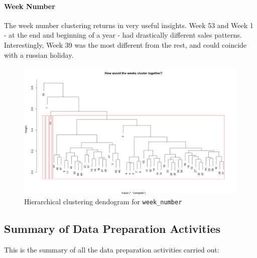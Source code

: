 \documentclass[floatsintext,man]{apa6}
\theoremstyle{definition}
\theoremstyle{definition}
\theoremstyle{definition}
\theoremstyle{remark}
\begin{document}
\paragraph{Week Number}\label{week-number}

The week number clustering returns in very useful insights. Week 53 and
Week 1 - at the end and beginning of a year - had drastically different
sales patterns. Interestingly, Week 39 was the most different from the
rest, and could coincide with a russian holiday.

\begin{figure}
\centering
\includegraphics{../graphs/hclust_week.png}
\caption{Hierarchical clustering dendogram for \texttt{week\_number}}
\end{figure}

\subsection{Summary of Data Preparation
Activities}\label{summary-of-data-preparation-activities}

This is the summary of all the data preparation activities carried out:
\end{document}
